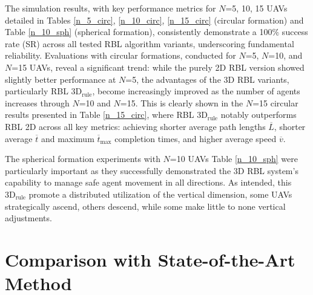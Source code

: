         The simulation results, with key performance metrics for $N$=5, 10, 15 \ac{UAV}s detailed in Tables \ref{n_5_circ}, \ref{n_10_circ}, \ref{n_15_circ} (circular formation) and Table \ref{n_10_sph} (spherical formation), consistently demonstrate a 100$\%$ success rate (SR) across all tested \ac{RBL} algorithm variants, underscoring fundamental reliability. 
        Evaluations with circular formations, conducted for $N$=5, $N$=10, and $N$=15 \ac{UAV}s, reveal a significant trend: while the purely 2D \ac{RBL} version showed slightly better performance at $N$=5, the advantages of the 3D \ac{RBL} variants, particularly \ac{RBL} $\text{3D}_{\text{rule}}$, become increasingly improved as the number of agents increases through $N$=10 and $N$=15. 
        This is clearly shown in the $N$=15 circular results presented in Table \ref{n_15_circ}, where \ac{RBL} $\text{3D}_{\text{rule}}$ notably outperforms \ac{RBL} 2D across all key metrics: achieving shorter average path lengths $\overline{L}$, shorter average $\overline{t}$ and maximum $\overline{t}_{\text{max}}$ completion times, and higher average speed $\overline{v}$.

        The spherical formation experiments with $N$=10 \ac{UAV}s Table \ref{n_10_sph} were particularly important as they successfully demonstrated the 3D \ac{RBL} system's capability to manage safe agent movement in all directions. 
        As intended, this $\text{3D}_{\text{rule}}$ promote a distributed utilization of the vertical dimension, some \ac{UAV}s strategically ascend, others descend, while some make little to none vertical adjustments. 
        
    \section{Comparison with State-of-the-Art Method}


